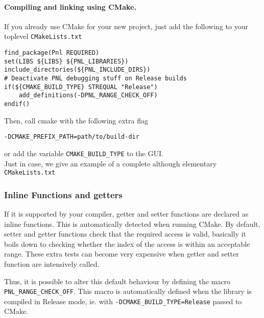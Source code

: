 \documentclass[a4paper,11pt,twoside]{article}
\begin{document}
\paragraph{Compiling and linking using CMake.}

If you already use CMake for your new project, just add the following to your toplevel
\verb!CMakeLists.txt!
\begin{verbatim}
find_package(Pnl REQUIRED)
set(LIBS ${LIBS} ${PNL_LIBRARIES})
include_directories(${PNL_INCLUDE_DIRS})
# Deactivate PNL debugging stuff on Release builds
if(${CMAKE_BUILD_TYPE} STREQUAL "Release")
    add_definitions(-DPNL_RANGE_CHECK_OFF)
endif()
\end{verbatim}
Then, call cmake with the following extra flag 
\begin{verbatim}
-DCMAKE_PREFIX_PATH=path/to/build-dir
\end{verbatim}
or add the variable \verb!CMAKE_BUILD_TYPE! to the GUI. \\

Just in case, we give an example of a complete although elementary \verb!CMakeLists.txt!


\subsubsection{Inline Functions and getters}
\label{sec:inline}

If it is supported by your compiler, getter and setter functions are declared
as inline functions. This is automatically detected when running CMake. By
default, setter and getter functions check that the required access is valid,
basically it boils down to checking whether the index of the access is within an
acceptable range. These extra tests can become very expensive when getter and
setter function are intensively called. 

Thus,  it is possible to alter this default behaviour by defining the macro
\texttt{PNL_RANGE_CHECK_OFF}. This macro is automatically defined when the
library is compiled in Release mode, ie. with \verb!-DCMAKE_BUILD_TYPE=Release!
passed to CMake.























\clearpage
{}
\printindex
\end{document}
